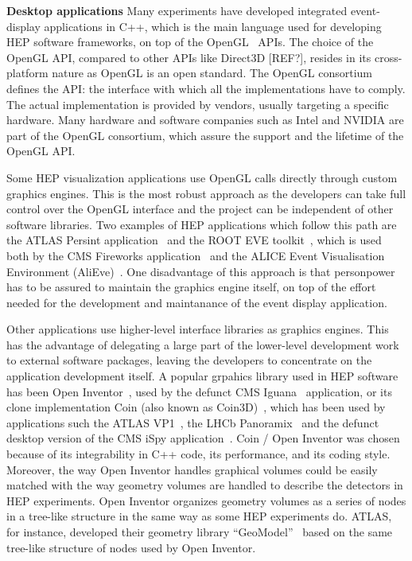 \documentclass[12pt,a4paper]{article}
\begin{document}
{\bf Desktop applications} Many experiments have developed integrated event-display applications in C++, which is the main language
used for developing HEP software frameworks, on top of the OpenGL~\cite{OpenGL1992} APIs.
The choice of the OpenGL API, compared to other APIs like Direct3D [REF?], resides in its cross-platform nature as
OpenGL is an open standard. The OpenGL consortium defines the API: the interface with which all the implementations have to
comply. The actual implementation is provided by vendors, usually targeting a specific hardware. Many hardware and
software companies such as Intel and NVIDIA are part of the OpenGL consortium, which assure
the support and the lifetime of the OpenGL API.

Some HEP visualization applications use OpenGL calls directly through custom graphics engines. This is the most
robust approach as the developers can take full control over the OpenGL interface
and the project can be independent of other software libraries. Two examples of HEP applications which follow this path are the
ATLAS Persint application~\cite{ATLASPersint2012} and the ROOT EVE toolkit~\cite{ROOTEVE2007}, which is used both by the CMS
Fireworks application~\cite{CMSFireworks} and the ALICE Event Visualisation Environment (AliEve)~\cite{alieve}.
One disadvantage of this approach is that personpower has to be assured to maintain the graphics engine itself,
on top of the effort needed for the development and maintanance of the event display application.


Other applications use higher-level interface libraries as graphics engines. This has the advantage of delegating
a large part of the lower-level development work to external software packages, leaving the developers to concentrate
on the application development itself. A popular grpahics library used in HEP software has been
Open Inventor~\cite{OpenInventor1993}, used by the defunct CMS Iguana~\cite{CMSIguanaPaperNIM,CMSIguana} application, or
its clone implementation Coin (also known as Coin3D)~\cite{Coin3D}, which has been used by applications such
the ATLAS VP1~\cite{ATLASVP12010}, the LHCb Panoramix~\cite{LHCbPanoramix} and the defunct desktop version of the
CMS iSpy application~\cite{CMSISpy}. Coin / Open Inventor was
chosen because of its integrability in C++ code, its performance, and its coding style. Moreover, the way Open Inventor handles
graphical volumes could be easily matched with the way geometry volumes are handled to describe the detectors in HEP experiments.
Open Inventor organizes geometry volumes as a series of nodes in a tree-like structure in the same way as some
HEP experiments do. ATLAS, for instance, developed their geometry library “GeoModel”~\cite{ATLASGeoModel2004} based on
the same tree-like structure of nodes used by Open Inventor.
\end{document}

